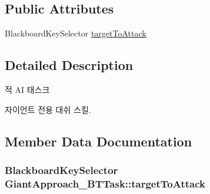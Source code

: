 \subsection*{Public Attributes}
\begin{DoxyCompactItemize}
\item 
Blackboard\+Key\+Selector \hyperlink{class_giant_approach___b_t_task_a6296d9126f5fc2e18266249e91090b18}{target\+To\+Attack}
\end{DoxyCompactItemize}


\subsection{Detailed Description}
적 AI 태스크 

자이언트 전용 대쉬 스킬. 

\subsection{Member Data Documentation}
\subsubsection[{\texorpdfstring{target\+To\+Attack}{targetToAttack}}]{\setlength{\rightskip}{0pt plus 5cm}Blackboard\+Key\+Selector Giant\+Approach\+\_\+\+B\+T\+Task\+::target\+To\+Attack}\hypertarget{class_giant_approach___b_t_task_a6296d9126f5fc2e18266249e91090b18}{}\label{class_giant_approach___b_t_task_a6296d9126f5fc2e18266249e91090b18}
